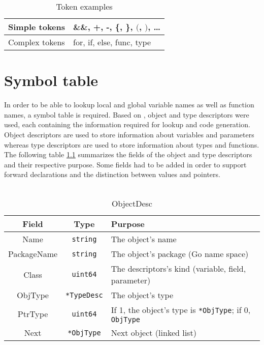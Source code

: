 \documentclass[a4paper]{scrreprt}
\begin{document}
    \begin{table}[htb]
    \centering
    \begin{tabular}{ll}
        \toprule
        Simple tokens & \&\&, +, -, \{, \}, $($, $)$, \dots \\
        \midrule
        Complex tokens & for, if, else, func, type \\
        \bottomrule
    \end{tabular}
    \caption{Token examples}
    \label{tbl:tokens}
    \end{table}

  \chapter{Symbol table}
    In order to be able to lookup local and global variable names as well as function names, a symbol table is required. Based on \cite{wir96}, object and type descriptors were used, each containing the information required for lookup and code generation. Object descriptors are used to store information about variables and parameters whereas type descriptors are used to store information about types and functions.\\
    The following table \ref{tbl:objectdesc} summarizes the fields of the object and type descriptors and their respective purpose. Some fields had to be added in order to support forward declarations and the distinction between values and pointers.\\ \\
      \begin{table}[htb]
      \centering
      \begin{tabular}{ccl}
        \toprule
        \textbf{Field} & \textbf{Type} & \textbf{Purpose}\\ 
        \midrule
        Name & \texttt{string} & The object's name\\
        \midrule
        PackageName & \texttt{string} & The object's package (Go name space)\\
        \midrule
        Class & \texttt{uint64} & The descriptors's kind (variable, field, parameter)\\
        \midrule
        ObjType & \texttt{*TypeDesc} & The object's type\\
        \midrule
        PtrType & \texttt{uint64} & If 1, the object's type is \texttt{*ObjType}; if 0, \texttt{ObjType}\\
        \midrule
        Next & \texttt{*ObjType} & Next object (linked list)\\
        \bottomrule
      \end{tabular}
      \caption{ObjectDesc}
      \label{tbl:objectdesc}
      \end{table}\\ \\
\end{document}
